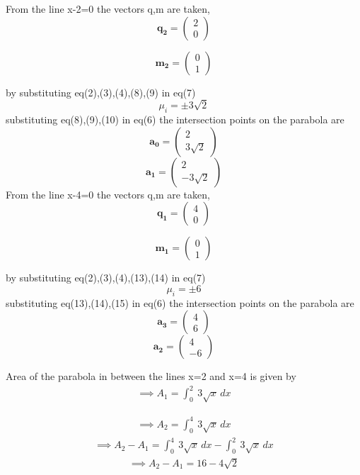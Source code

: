\documentclass[journal,10pt,twocolumn]{article}
\let\vec\mathbf
\newcommand{\myvec}[1]{\ensuremath{\begin{pmatrix}#1\end{pmatrix}}}
\begin{document}
From the line x-2=0 the vectors q,m are taken,
\begin{equation}
\vec{q_2}=\myvec{2\\0}
\end{equation}

\begin{equation}
\vec{m_2}=\myvec{0\\1}
\end{equation}

by substituting eq(2),(3),(4),(8),(9) in eq(7)
\begin{equation}
\mu_i=\pm 3\sqrt{2}
\end{equation}
substituting eq(8),(9),(10) in eq(6) the intersection points on the parabola are
\begin{equation}
\vec{a_0}=\myvec{2\\3\sqrt{2}}
\end{equation}
\begin{equation}
\vec{a_1}=\myvec{2\\-3\sqrt{2}}
\end{equation}
From the line x-4=0 the vectors q,m are taken,
\begin{equation}
\vec{q_1}=\myvec{4\\0}
\end{equation}

\begin{equation}
\vec{m_1}=\myvec{0\\1}
\end{equation}

by substituting eq(2),(3),(4),(13),(14) in eq(7)
\begin{equation}
\mu_i=\pm 6
\end{equation}
substituting eq(13),(14),(15) in eq(6) the intersection points on the parabola are
\begin{equation}
\vec{a_3}=\myvec{4\\6}
\end{equation}
\begin{equation}
\vec{a_2}=\myvec{4\\-6}
\end{equation}

Area of the parabola in between the lines x=2 and x=4 is given by
\begin{align}
\implies A_1=\int_{0}^{2} \ 3\sqrt{x} \,dx
\end{align}

\begin{align}
\implies A_2=\int_{0}^{4} \ 3\sqrt{x} \,dx
\end{align}
\begin{align}
\implies A_2- A_1=\int_{0}^{4} \ 3\sqrt{x} \,dx-\int_{0}^{2} \ 3\sqrt{x} \,dx
\end{align}
\begin{align}
\implies A_2- A_1=16-4\sqrt{2}
\end{align}
\end{document}
